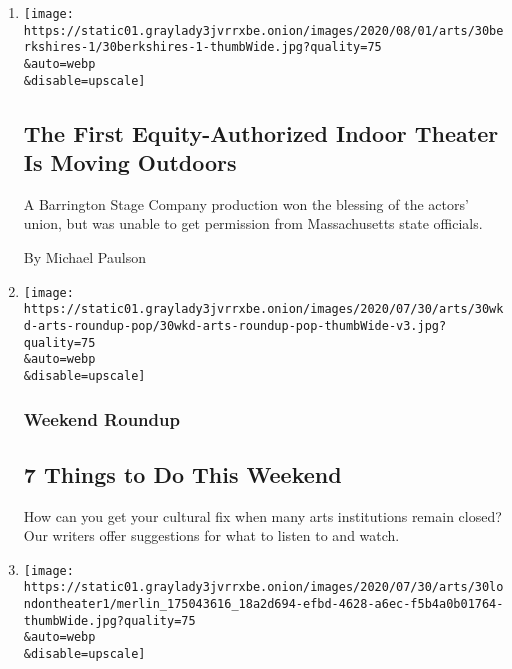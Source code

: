 \begin{enumerate}
\def\labelenumi{\arabic{enumi}.}
\item
  \href{/2020/07/30/theater/the-first-equity-authorized-indoor-theater-is-moving-outdoors.html}{}

  \texttt{[image: https://static01.graylady3jvrrxbe.onion/images/2020/08/01/arts/30berkshires-1/30berkshires-1-thumbWide.jpg?quality=75\\\&auto=webp\\\&disable=upscale]}

  \hypertarget{the-first-equity-authorized-indoor-theater-is-moving-outdoors}{%
  \subsection{The First Equity-Authorized Indoor Theater Is Moving
  Outdoors}\label{the-first-equity-authorized-indoor-theater-is-moving-outdoors}}

  A Barrington Stage Company production won the blessing of the actors'
  union, but was unable to get permission from Massachusetts state
  officials.

  By Michael Paulson
\item
  \href{/2020/07/30/arts/things-to-do-weekend-coronavirus.html}{}

  \texttt{[image: https://static01.graylady3jvrrxbe.onion/images/2020/07/30/arts/30wkd-arts-roundup-pop/30wkd-arts-roundup-pop-thumbWide-v3.jpg?quality=75\\\&auto=webp\\\&disable=upscale]}

  \hypertarget{weekend-roundup}{%
  \subsubsection{Weekend Roundup}\label{weekend-roundup}}

  \hypertarget{7-things-to-do-this-weekend}{%
  \subsection{7 Things to Do This
  Weekend}\label{7-things-to-do-this-weekend}}

  How can you get your cultural fix when many arts institutions remain
  closed? Our writers offer suggestions for what to listen to and watch.
\item
  \href{/2020/07/30/theater/patsy-ferran-michelle-terry-lucian-msamati.html}{}

  \texttt{[image: https://static01.graylady3jvrrxbe.onion/images/2020/07/30/arts/30londontheater1/merlin\_175043616\_18a2d694-efbd-4628-a6ec-f5b4a0b01764-thumbWide.jpg?quality=75\\\&auto=webp\\\&disable=upscale]}


\end{enumerate}
